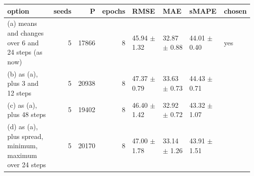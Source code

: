 \begin{tabular}{lrrrllll}
\toprule
option & seeds & P & epochs & RMSE & MAE & sMAPE & chosen \\
\midrule
(a) means and changes over 6 and 24 steps (as now) & 5 & 17866 & 8 & 45.94 $\pm$ 1.32 & 32.87 $\pm$ 0.88 & 44.01 $\pm$ 0.40 & yes \\
(b) as (a), plus 3 and 12 steps & 5 & 20938 & 8 & 47.37 $\pm$ 0.79 & 33.63 $\pm$ 0.73 & 44.43 $\pm$ 0.71 &  \\
(c) as (a), plus 48 steps & 5 & 19402 & 8 & 46.40 $\pm$ 1.42 & 32.92 $\pm$ 0.72 & 43.32 $\pm$ 1.07 &  \\
(d) as (a), plus spread, minimum, maximum over 24 steps & 5 & 20170 & 8 & 47.00 $\pm$ 1.78 & 33.14 $\pm$ 1.26 & 43.91 $\pm$ 1.51 &  \\
\bottomrule
\end{tabular}
